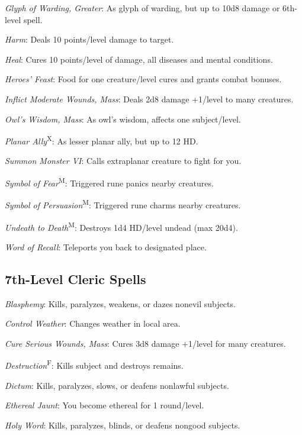 \textit{Glyph of Warding, Greater}: As glyph of warding, but up to 10d8 damage or 6th-level spell.

\textit{Harm}: Deals 10 points/level damage to target.

\textit{Heal}: Cures 10 points/level of damage, all diseases and mental conditions.

\textit{Heroes' Feast}: Food for one creature/level cures and grants combat bonuses.

\textit{Inflict Moderate Wounds, Mass}: Deals 2d8 damage +1/level to many creatures.

\textit{Owl's Wisdom, Mass}: As owl's wisdom, affects one subject/level.

\textit{Planar Ally}\textsuperscript{X}: As lesser planar ally, but up to 12 HD.

\textit{Summon Monster VI}: Calls extraplanar creature to fight for you.

\textit{Symbol of Fear}\textsuperscript{M}: Triggered rune panics nearby creatures.

\textit{Symbol of Persuasion}\textsuperscript{M}: Triggered rune charms nearby creatures.

\textit{Undeath to Death}\textsuperscript{M}: Destroys 1d4 HD/level undead (max 20d4).


\textit{Word of Recall}: Teleports you back to designated place.



\subsection{7th-Level Cleric Spells}

\textit{Blasphemy}: Kills, paralyzes, weakens, or dazes nonevil subjects.

\textit{Control Weather}: Changes weather in local area.

\textit{Cure Serious Wounds, Mass}: Cures 3d8 damage +1/level for many creatures.

\textit{Destruction}\textsuperscript{F}: Kills subject and destroys remains.

\textit{Dictum}: Kills, paralyzes, slows, or deafens nonlawful subjects.

\textit{Ethereal Jaunt}: You become ethereal for 1 round/level.

\textit{Holy Word}: Kills, paralyzes, blinds, or deafens nongood subjects.

